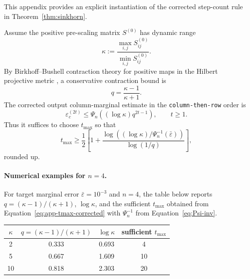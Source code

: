 \documentclass[11pt]{article}
\numberwithin{equation}{section}
\theoremstyle{plain}
\theoremstyle{definition}
\theoremstyle{remark}
\begin{document}
This appendix provides an explicit instantiation of the corrected step-count rule in Theorem~\ref{thm:sinkhorn}.

Assume the positive pre-scaling matrix $S^{(0)}$ has dynamic range
\begin{equation}
\kappa:=\frac{\max_{i,j} S^{(0)}_{ij}}{\min_{i,j} S^{(0)}_{ij}}.
\end{equation}
By Birkhoff--Bushell contraction theory for positive maps in the Hilbert projective metric
\cite{Birkhoff1957,Bushell1973}, a conservative contraction bound is
\begin{equation}\label{eq:app-q}
q =\frac{\kappa-1}{\kappa+1}.
\end{equation}
The corrected output column-marginal estimate in the \texttt{column-then-row} order is
\begin{equation}\label{eq:app-corrected-design-law}
\varepsilon_c^{(2t)}
\le
\Psi_n\!\left((\log\kappa)q^{2t-1}\right),
\qquad t\ge1.
\end{equation}
Thus it suffices to choose $t_{\max}$ so that
\begin{equation}\label{eq:app-tmax-corrected}
t_{\max}
\ge
\frac12
\left[
1+
\frac{\log\!\left((\log\kappa)/\Psi_n^{-1}(\bar\varepsilon)\right)}
{\log(1/q)}
\right],
\end{equation}
rounded up.

\paragraph{Numerical examples for $n=4$.}
For target marginal error $\bar\varepsilon=10^{-3}$ and $n=4$, the table below reports
$q=(\kappa-1)/(\kappa+1)$, $\log\kappa$, and the sufficient $t_{\max}$ obtained from
Equation~\eqref{eq:app-tmax-corrected} with $\Psi_n^{-1}$ from Equation~\eqref{eq:Psi-inv}.

\begin{center}
\begin{tabular}{@{}cccc@{}}
\toprule
$\kappa$ & $q=(\kappa-1)/(\kappa+1)$ & $\log\kappa$ & sufficient $t_{\max}$\\
\midrule
2& 0.333 & 0.693 & 4\\
5& 0.667 & 1.609 & 10 \\
10 & 0.818 & 2.303 & 20 \\
\bottomrule
\end{tabular}
\end{center}
\end{document}
